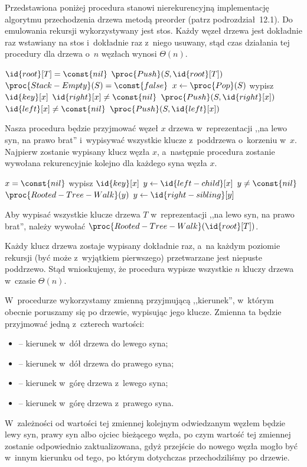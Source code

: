 \exercise %
Przedstawiona poniżej procedura stanowi nierekurencyjną implementację algorytmu przechodzenia drzewa metodą preorder (patrz podrozdział~12.1). Do emulowania rekursji wykorzystywany jest stos. Każdy węzeł drzewa jest dokładnie raz wstawiany na stos i~dokładnie raz z~niego usuwany, stąd czas działania tej procedury dla drzewa o~$n$ węzłach wynosi $\Theta(n)$.
\begin{codebox}
\li	\If $\id{root}[T]=\const{nil}$
\li		\Then \Return
		\End
\li	$\proc{Push}(S,\id{root}[T])$
\li	\While $\proc{Stack-Empty}(S)=\const{false}$
\li		\Do
			$x\gets\proc{Pop}(S)$
\li			wypisz $\id{key}[x]$
\li			\If $\id{right}[x]\ne\const{nil}$
\li				\Then $\proc{Push}(S,\id{right}[x])$
				\End
\li			\If $\id{left}[x]\ne\const{nil}$
\li				\Then $\proc{Push}(S,\id{left}[x])$
				\End
		\End
\end{codebox}

\exercise %
Nasza procedura będzie przyjmować węzeł $x$ drzewa w~reprezentacji ,,na lewo syn, na prawo brat'' i~wypisywać wszystkie klucze z~poddrzewa o~korzeniu w~$x$. Najpierw zostanie wypisany klucz węzła $x$, a~następnie procedura zostanie wywołana rekurencyjnie kolejno dla każdego syna węzła $x$.
\begin{codebox}
\li	\If $x=\const{nil}$
\li		\Then \Return
		\End
\li	wypisz $\id{key}[x]$
\li	$y\gets\id{left-child}[x]$
\li	\While $y\ne\const{nil}$
\li		\Do
			$\proc{Rooted-Tree-Walk}(y)$
\li			$y\gets\id{right-sibling}[y]$
		\End
\end{codebox}
Aby wypisać wszystkie klucze drzewa $T$ w~reprezentacji ,,na lewo syn, na prawo brat'', należy wywołać $\proc{Rooted-Tree-Walk}(\id{root}[T])$.

Każdy klucz drzewa zostaje wypisany dokładnie raz, a~na każdym poziomie rekursji (być może z~wyjątkiem pierwszego) przetwarzane jest niepuste poddrzewo. Stąd wnioskujemy, że procedura wypisze wszystkie $n$ kluczy drzewa w~czasie $\Theta(n)$.

\exercise %
W~procedurze wykorzystamy zmienną  przyjmującą ,,kierunek'', w~którym obecnie poruszamy się po drzewie, wypisując jego klucze. Zmienna ta będzie przyjmować jedną z~czterech wartości:
\begin{itemize}
    \item {} -- kierunek w~dół drzewa do lewego syna;
    \item {} -- kierunek w~dół drzewa do prawego syna;
    \item {} -- kierunek w~górę drzewa z~lewego syna;
    \item {} -- kierunek w~górę drzewa z~prawego syna.
\end{itemize}
W~zależności od wartości tej zmiennej kolejnym odwiedzanym węzłem będzie lewy syn, prawy syn albo ojciec bieżącego węzła, po czym wartość tej zmiennej zostanie odpowiednio zaktualizowana, gdyż przejście do nowego węzła mogło być w~innym kierunku od tego, po którym dotychczas przechodziliśmy po drzewie.

